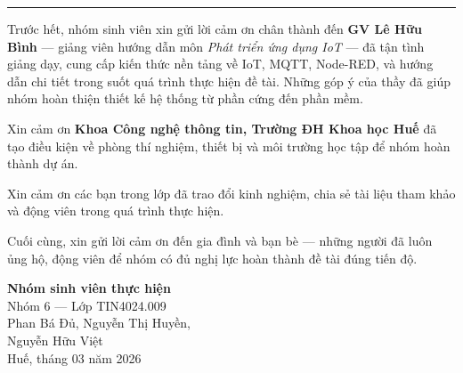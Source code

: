 \documentclass[13pt,a4paper]{article}
\begin{document}
\newpage
\thispagestyle{empty}
\vspace*{0.35\baselineskip}
{\normalsize
    \tableofcontents
}
\newpage
\thispagestyle{empty}
\vspace*{0.4cm}
\begin{center}
    \fontsize{19}{24}\selectfont\bfseries{}\par
    \vspace{0.25ex}
    \rule{0.30\textwidth}{1.8pt}
\end{center}
\vspace{0.85cm}

{}

\parindent=1.1cm
\setlength{\parskip}{0.6ex plus 0.2ex}
Trước hết, nhóm sinh viên xin gửi lời cảm ơn chân thành đến \textbf{GV Lê Hữu Bình} --- giảng viên hướng dẫn môn \textit{Phát triển ứng dụng IoT} --- đã tận tình giảng dạy, cung cấp kiến thức nền tảng về IoT, MQTT, Node-RED, và hướng dẫn chi tiết trong suốt quá trình thực hiện đề tài. Những góp ý của thầy đã giúp nhóm hoàn thiện thiết kế hệ thống từ phần cứng đến phần mềm.

Xin cảm ơn \textbf{Khoa Công nghệ thông tin, Trường ĐH Khoa học Huế} đã tạo điều kiện về phòng thí nghiệm, thiết bị và môi trường học tập để nhóm hoàn thành dự án.

Xin cảm ơn các bạn trong lớp đã trao đổi kinh nghiệm, chia sẻ tài liệu tham khảo và động viên trong quá trình thực hiện.

Cuối cùng, xin gửi lời cảm ơn đến gia đình và bạn bè --- những người đã luôn ủng hộ, động viên để nhóm có đủ nghị lực hoàn thành đề tài đúng tiến độ.

\parindent=0pt
\parskip=0pt
\vspace{0.8cm}
\hfill\begin{minipage}[t]{7cm}
    \fontsize{12}{15}\selectfont
    \begin{flushright}
        \textbf{Nhóm sinh viên thực hiện}\\
        Nhóm 6 --- Lớp TIN4024.009\\
        Phan Bá Đủ, Nguyễn Thị Huyền,\\
        Nguyễn Hữu Việt\\[0.5em]
        Huế, tháng 03 năm 2026
    \end{flushright}
\end{minipage}
\end{document}
